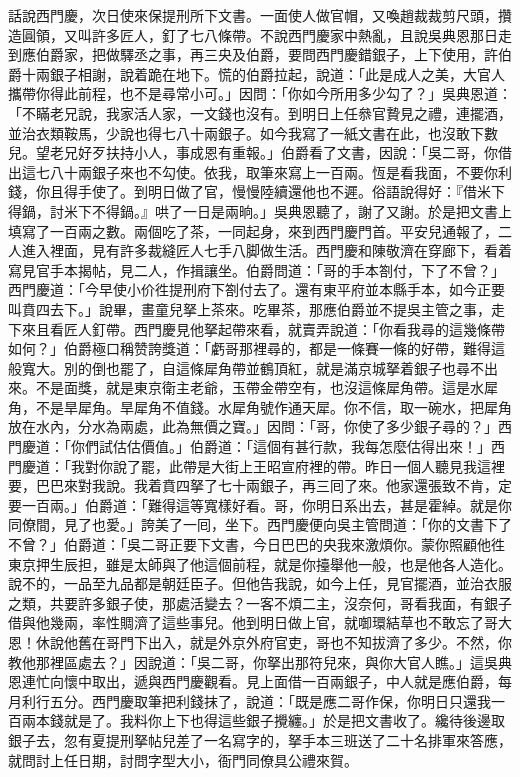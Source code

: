 話說西門慶，次日使來保提刑所下文書。一面使人做官帽，又喚趙裁裁剪尺頭，攢造圓領，又叫許多匠人，釘了七八條帶。不說西門慶家中熱亂，且說吳典恩那日走到應伯爵家，把做驛丞之事，再三央及伯爵，要問西門慶錯銀子，上下使用，許伯爵十兩銀子相謝，說着跪在地下。慌的伯爵拉起，說道：「此是成人之美，大官人攜帶你得此前程，也不是尋常小可。」因問：「你如今所用多少勾了？」吳典恩道：「不瞞老兄說，我家活人家，一文錢也沒有。到明日上任叅官贄見之禮，連擺酒，並治衣類鞍馬，少說也得七八十兩銀子。如今我寫了一紙文書在此，也沒敢下數兒。望老兄好歹扶持小人，事成恩有重報。」伯爵看了文書，因說：「吳二哥，你借出這七八十兩銀子來也不勾使。依我，取筆來寫上一百兩。恆是看我面，不要你利錢，你且得手使了。到明日做了官，慢慢陸續還他也不遲。俗語說得好：『借米下得鍋，討米下不得鍋。』哄了一日是兩晌。」{}吳典恩聽了，謝了又謝。於是把文書上填寫了一百兩之數。兩個吃了茶，一同起身，來到西門慶門首。平安兒通報了，二人進入裡面，見有許多裁縫匠人七手八脚做生活。西門慶和陳敬濟在穿廊下，看着寫見官手本揭帖，見二人，作揖讓坐。伯爵問道：「哥的手本劄付，下了不曾？」西門慶道：「今早使小价徃提刑府下劄付去了。還有東平府並本縣手本，如今正要叫賁四去下。」說畢，畫童兒拏上茶來。吃畢茶，那應伯爵並不提吳主管之事，{}走下來且看匠人釘帶。西門慶見他拏起帶來看，就賣弄說道：「你看我尋的這幾條帶如何？」伯爵極口稱赞誇獎道：「虧哥那裡尋的，都是一條賽一條的好帶，難得這般寬大。別的倒也罷了，自這條犀角帶並鶴頂紅，就是滿京城拏着銀子也尋不出來。不是面獎，就是東京衛主老爺，玉帶金帶空有，也沒這條犀角帶。這是水犀角，不是旱犀角。旱犀角不值錢。水犀角號作通天犀。你不信，取一碗水，把犀角放在水內，分水為兩處，此為無價之寶。」{}因問：「哥，你使了多少銀子尋的？」西門慶道：「你們試估估價值。」伯爵道：「這個有甚行款，我每怎麼估得出來！」西門慶道：「我對你說了罷，此帶是大街上王昭宣府裡的帶。昨日一個人聽見我這裡要，巴巴來對我說。我着賁四拏了七十兩銀子，再三囘了來。他家還張致不肯，定要一百兩。」伯爵道：「難得這等寬樣好看。哥，你明日系出去，甚是霍綽。就是你同僚間，見了也愛。」誇美了一囘，坐下。西門慶便向吳主管問道：「你的文書下了不曾？」{}伯爵道：「吳二哥正要下文書，今日巴巴的央我來激煩你。蒙你照顧他徃東京押生辰担，雖是太師與了他這個前程，就是你擡舉他一般，也是他各人造化。說不的，一品至九品都是朝廷臣子。但他告我說，如今上任，見官擺酒，並治衣服之類，共要許多銀子使，那處活變去？一客不煩二主，沒奈何，哥看我面，{}有銀子借與他幾兩，率性賙濟了這些事兒。他到明日做上官，就啣環結草也不敢忘了哥大恩！休說他舊在哥門下出入，就是外京外府官吏，哥也不知拔濟了多少。不然，你教他那裡區處去？」{}因說道：「吳二哥，你拏出那符兒來，{}與你大官人瞧。」這吳典恩連忙向懷中取出，遞與西門慶觀看。見上面借一百兩銀子，中人就是應伯爵，每月利行五分。西門慶取筆把利錢抹了，說道：「既是應二哥作保，你明日只還我一百兩本錢就是了。我料你上下也得這些銀子攪纏。」於是把文書收了。纔待後邊取銀子去，忽有夏提刑拏帖兒差了一名寫字的，拏手本三班送了二十名排軍來答應，{}就問討上任日期，討問字型大小，衙門同僚具公禮來賀。
